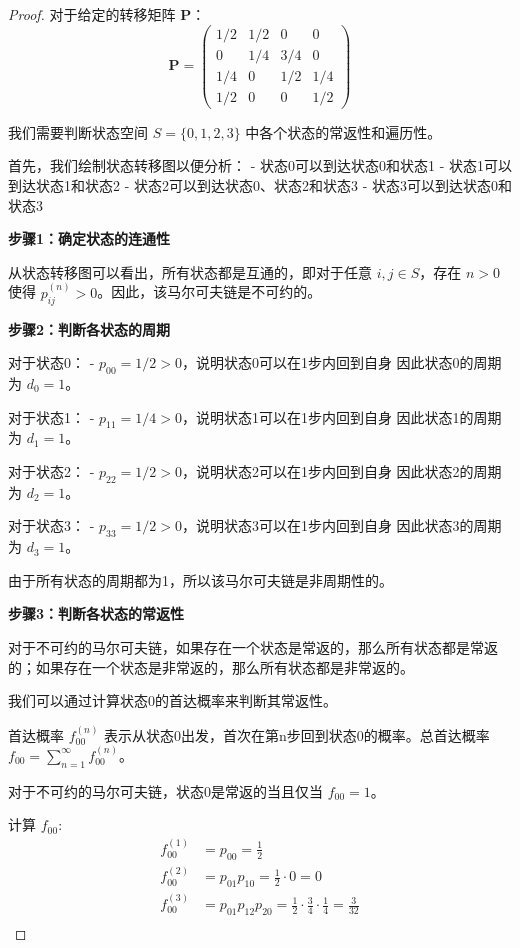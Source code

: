 \documentclass[lang=cn,10pt,thmcnt=section]{elegantbook}
\begin{document}
\begin{proof}
	对于给定的转移矩阵 $\mathbf{P}$：
\[
\mathbf{P} = \begin{pmatrix}
1/2 & 1/2 & 0 & 0 \\
0 & 1/4 & 3/4 & 0 \\
1/4 & 0 & 1/2 & 1/4 \\
1/2 & 0 & 0 & 1/2
\end{pmatrix}
\]

我们需要判断状态空间 $S = \{0, 1, 2, 3\}$ 中各个状态的常返性和遍历性。

首先，我们绘制状态转移图以便分析：
- 状态0可以到达状态0和状态1
- 状态1可以到达状态1和状态2
- 状态2可以到达状态0、状态2和状态3
- 状态3可以到达状态0和状态3

\textbf{步骤1：确定状态的连通性}

从状态转移图可以看出，所有状态都是互通的，即对于任意 $i, j \in S$，存在 $n > 0$ 使得 $p_{ij}^{(n)} > 0$。因此，该马尔可夫链是不可约的。

\textbf{步骤2：判断各状态的周期}

对于状态0：
- $p_{00} = 1/2 > 0$，说明状态0可以在1步内回到自身
因此状态0的周期为 $d_0 = 1$。

对于状态1：
- $p_{11} = 1/4 > 0$，说明状态1可以在1步内回到自身
因此状态1的周期为 $d_1 = 1$。

对于状态2：
- $p_{22} = 1/2 > 0$，说明状态2可以在1步内回到自身
因此状态2的周期为 $d_2 = 1$。

对于状态3：
- $p_{33} = 1/2 > 0$，说明状态3可以在1步内回到自身
因此状态3的周期为 $d_3 = 1$。

由于所有状态的周期都为1，所以该马尔可夫链是非周期性的。

\textbf{步骤3：判断各状态的常返性}

对于不可约的马尔可夫链，如果存在一个状态是常返的，那么所有状态都是常返的；如果存在一个状态是非常返的，那么所有状态都是非常返的。

我们可以通过计算状态0的首达概率来判断其常返性。

首达概率 $f_{00}^{(n)}$ 表示从状态0出发，首次在第n步回到状态0的概率。总首达概率 $f_{00} = \sum_{n=1}^{\infty} f_{00}^{(n)}$。

对于不可约的马尔可夫链，状态0是常返的当且仅当 $f_{00} = 1$。

计算 $f_{00}$:
\begin{align}
f_{00}^{(1)} &= p_{00} = \frac{1}{2}\\
f_{00}^{(2)} &= p_{01}p_{10} = \frac{1}{2} \cdot 0 = 0\\
f_{00}^{(3)} &= p_{01}p_{12}p_{20} = \frac{1}{2} \cdot \frac{3}{4} \cdot \frac{1}{4} = \frac{3}{32}\\
\end{align}


\end{proof}
\end{document}
